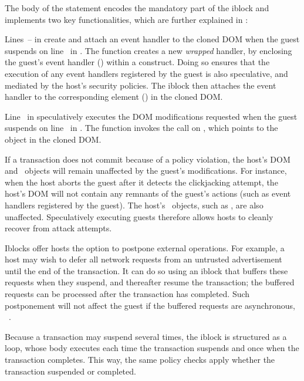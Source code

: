 The body of the  statement encodes the mandatory part of the
iblock and implements two key functionalities, which are further explained in
:
%
\begin{mylist}
%
\item Lines~-- in  create and attach
an event handler to the cloned DOM when the guest suspends on line~ in
. The  function creates a new
\textit{wrapped} handler, by enclosing the guest's event handler
() within a  construct. Doing so ensures that
the execution of any event handlers registered by the guest is also speculative,
and mediated by the host's security policies. The iblock then attaches the event
handler to the corresponding element () in the cloned DOM.
%
\item Line~ in  speculatively executes the
DOM modifications requested when the guest suspends on line~ in
. The  function invokes the
 call on , which points to the  object in
the cloned DOM.
%
\end{mylist}

If a transaction does not commit because of a policy violation, the host's DOM
and \js\ objects will remain unaffected by the guest's modifications. For
instance, when the host
aborts the guest after it
detects the clickjacking attempt, the host's DOM will not contain any remnants
of the guest's actions (such as event handlers registered by the guest).  The
host's \js\ objects, such as , are also unaffected. Speculatively
executing guests therefore allows hosts to cleanly recover from attack
attempts.

Iblocks offer hosts the option to postpone external operations. For example, a
host may wish to defer all network requests from an untrusted advertisement
until the end of the transaction. It can do so using an iblock that buffers
these requests when they suspend, and thereafter resume the transaction; the
buffered requests can be processed after the transaction has completed. Such
postponement will not affect the guest if the buffered requests are
asynchronous, \eg~.

Because a transaction may suspend several times, the iblock is structured as a
loop, whose body executes each time the transaction suspends and once when the
transaction completes. This way, the same policy checks apply whether the
transaction suspended or completed.